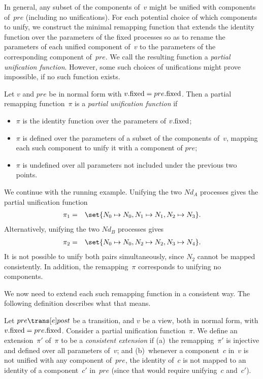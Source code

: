 
In general, any subset of the components of~$v$ might be unified with
components of~$pre$ (including no unifications).  For each potential choice of
which components to unify, we construct the minimal remapping function that
extends the identity function over the parameters of the fixed processes so as
to rename the parameters of each unified component of~$v$ to the parameters of
the corresponding component of~$pre$.  We call the resulting function a
\emph{partial unification function}.  However, some such choices of
unifications might prove impossible, if no such function exists.
%
\begin{definition}
Let $v$ and $pre$ be in normal form with $v.\mathrm{fixed} = pre.\mathrm{fixed}$.  Then a
partial remapping function~$\pi$ is a \emph{partial unification function} if
\begin{itemize}
\item $\pi$ is the identity function over the parameters of $v.\mathrm{fixed}$;

\item $\pi$ is defined over the parameters of a subset of the components
  of~$v$, mapping each such component to unify it with a component of $pre$;

\item $\pi$ is undefined over all parameters not included under the previous
  two points.
\end{itemize}
\end{definition}



\begin{example}
We continue with the running example.  Unifying the two $Nd_A$ processes
gives the partial unification function
%
\begin{eqnarray*}
\pi_1 & = & \set{N_0 \mapsto N_0, N_1 \mapsto N_1, N_2 \mapsto N_3}.
\end{eqnarray*}
%
Alternatively, unifying the two $Nd_B$ processes gives
\begin{eqnarray*}
\pi_2 & = & \set{N_0 \mapsto N_0, N_2 \mapsto N_2, N_3 \mapsto N_4}.
\end{eqnarray*}
It is not possible to unify both pairs simultaneously, since $N_2$ cannot be
mapped consistently.  In addition, the remapping~$\pi$ corresponds to unifying
no components.
\end{example}

We now need to extend each such remapping function in a consistent way.  The
following definition describes what that means.
%
\begin{definition}
\label{def:consistent-extension}
Let $pre \trans[e] post$ be a transition, and $v$ be a view, both in normal
form, with $v.\mathrm{fixed} = pre.\mathrm{fixed}$.
%
Consider a partial unification function~$\pi$.  We define an extension~$\pi'$
of~$\pi$ to be a \emph{consistent extension} if (a)~the remapping~$\pi'$ is
injective and defined over all parameters of~$v$; and (b)~whenever a
component~$c$ in~$v$ is not unified with any component of~$pre$, the identity
of~$c$ is not mapped to an identity of a component~$c'$ in~$pre$ (since that
would require unifying~$c$ and~$c'$).
\end{definition}

